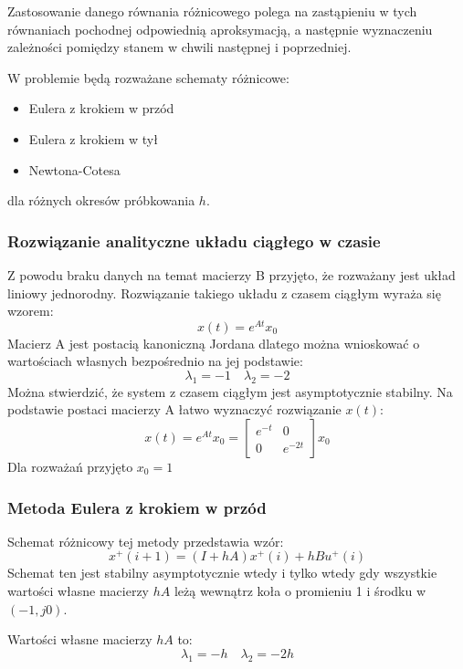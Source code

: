 \documentclass[a4paper,11pt]{article}
\begin{document}
Zastosowanie danego równania różnicowego polega na zastąpieniu w tych równaniach pochodnej odpowiednią aproksymacją, a następnie wyznaczeniu zależności pomiędzy stanem w chwili następnej i poprzedniej. 

W problemie będą rozważane schematy różnicowe:
\begin{itemize}
\item Eulera z krokiem w przód
\item Eulera z krokiem w tył
\item Newtona-Cotesa 
\end{itemize}
dla różnych okresów próbkowania \( h \).
\subsubsection{Rozwiązanie analityczne układu ciągłego w czasie}
Z powodu braku danych na temat macierzy B przyjęto, że rozważany jest układ liniowy jednorodny. Rozwiązanie takiego układu z czasem ciągłym wyraża się wzorem: 
\begin{equation*}
x(t)=e^{At}x_{0}
\end{equation*}
Macierz A jest postacią kanoniczną Jordana dlatego można wnioskować o wartościach własnych bezpośrednio na jej podstawie:
\begin{equation*}
\lambda_{1} = -1 \quad \lambda_{2} = -2
\end{equation*}
Można stwierdzić, że system z czasem ciągłym jest asymptotycznie stabilny. Na podstawie postaci macierzy A łatwo wyznaczyć rozwiązanie \( x(t) \):
\begin{equation*}
x(t)=e^{At}x_{0}=
\begin{bmatrix}
e^{-t} & 0 \\
0 & e^{-2t}
\end{bmatrix}
x_{0}
\end{equation*}
Dla rozważań przyjęto \( x_{0} = 1  \)
\subsubsection{Metoda Eulera z krokiem w przód}
Schemat różnicowy tej metody przedstawia wzór:
\begin{equation*}
x^{+}(i+1)=(I+hA)x^{+}(i)+hBu^{+}(i)
\end{equation*}
Schemat ten jest stabilny asymptotycznie wtedy i tylko wtedy gdy wszystkie wartości własne macierzy \( hA \) leżą wewnątrz koła o promieniu 1 i środku w \( (-1, j0) \). 

Wartości własne macierzy \( hA \) to:
\begin{equation*}
\lambda_{1} = -h \quad \lambda_{2} = -2h
\end{equation*}
\end{document}
